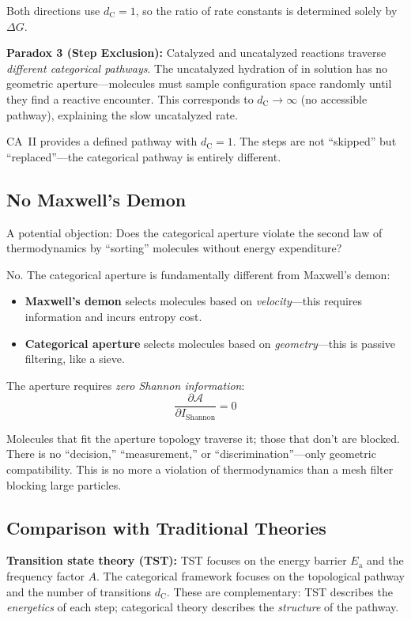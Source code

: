 \documentclass[twocolumn,amsmath,amssymb,aps,prb,superscriptaddress,longbibliography]{revtex4-2}
\newcommand{\dC}{d_{\mathrm{C}}}
\newcommand{\Ea}{E_{\mathrm{a}}}
\newcommand{\calA}{\mathcal{A}}
\begin{document}
Both directions use $\dC = 1$, so the ratio of rate constants is determined solely by $\Delta G$.

\textbf{Paradox 3 (Step Exclusion):} Catalyzed and uncatalyzed reactions traverse \emph{different categorical pathways}. The uncatalyzed hydration of  in solution has no geometric aperture---molecules must sample configuration space randomly until they find a reactive encounter. This corresponds to $\dC \to \infty$ (no accessible pathway), explaining the slow uncatalyzed rate.

CA~II provides a defined pathway with $\dC = 1$. The steps are not ``skipped'' but ``replaced''---the categorical pathway is entirely different.

\subsection{No Maxwell's Demon}

A potential objection: Does the categorical aperture violate the second law of thermodynamics by ``sorting'' molecules without energy expenditure?

No. The categorical aperture is fundamentally different from Maxwell's demon:
\begin{itemize}
\item \textbf{Maxwell's demon} selects molecules based on \emph{velocity}---this requires information and incurs entropy cost.
\item \textbf{Categorical aperture} selects molecules based on \emph{geometry}---this is passive filtering, like a sieve.
\end{itemize}

The aperture requires \emph{zero Shannon information}:
\begin{equation}
\frac{\partial \calA}{\partial I_{\text{Shannon}}} = 0
\end{equation}

Molecules that fit the aperture topology traverse it; those that don't are blocked. There is no ``decision,'' ``measurement,'' or ``discrimination''---only geometric compatibility. This is no more a violation of thermodynamics than a mesh filter blocking large particles.

\subsection{Comparison with Traditional Theories}

\textbf{Transition state theory (TST):} TST focuses on the energy barrier $\Ea$ and the frequency factor $A$. The categorical framework focuses on the topological pathway and the number of transitions $\dC$. These are complementary: TST describes the \emph{energetics} of each step; categorical theory describes the \emph{structure} of the pathway.
\end{document}
